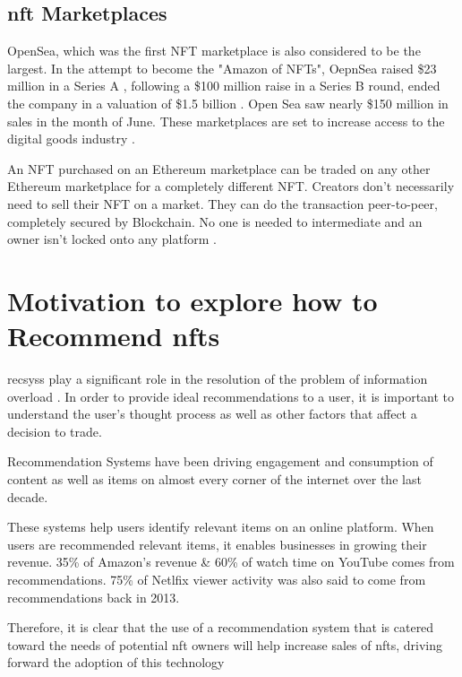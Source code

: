 \documentclass[conference]{IEEEtran}
\begin{document}
\subsection{\gls{nft} Marketplaces}
OpenSea, which was the first NFT marketplace is also considered to be the largest. In the attempt to become the "Amazon of NFTs", OepnSea raised \$23 million in a Series A \autocite{hackett_this_2021}, following a \$100 million raise in a Series B round, ended the company in a valuation of \$1.5 billion \autocite{dfinzer_announcing_2021, matney_nft_2021}. Open Sea saw nearly \$150 million in sales in the month of June.
These marketplaces are set to increase access to the digital goods industry \autocite{chevet_blockchain_2018}.


An NFT purchased on an Ethereum marketplace can be traded on any other Ethereum marketplace for a completely different NFT. Creators don't necessarily need to sell their NFT on a market. They can do the transaction peer-to-peer, completely secured by Blockchain. No one is needed to intermediate and an owner isn't locked onto any platform \autocite{noauthor_erc-721_nodate}.


\section{Motivation to explore how to Recommend \gls{nft}s}

\gls{recsys}s play a significant role in the resolution of the problem of information overload \autocite{cheng_hybrid_2020}. In order to provide ideal recommendations to a user, it is important to understand the user's thought process as well as other factors that affect a decision to trade.

Recommendation Systems have been driving engagement and consumption of content as well as items on almost every corner of the internet over the last decade.

These systems help users identify relevant items on an online platform. When users are recommended relevant items, it enables businesses in growing their revenue. 35\% of Amazon’s revenue \autocite{naumov_deep_2019} \& 60\% of watch time on YouTube \autocite{noauthor_recommendations_nodate} comes from recommendations. 75\% of Netlfix viewer activity \cite{vanderbilt_science_nodate} was also said to come from recommendations back in 2013.

Therefore, it is clear that the use of a recommendation system that is catered toward the needs of potential \gls{nft} owners will help increase sales of \gls{nft}s, driving forward the adoption of this technology
\end{document}
